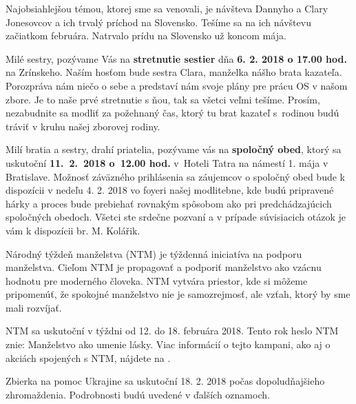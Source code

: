 Najobsiahlejšou témou, ktorej sme sa venovali, je návšteva Dannyho a Clary Jonesovcov a ich trvalý príchod na Slovensko. Tešíme sa na ich návštevu začiatkom februára. Natrvalo prídu na Slovensko už koncom mája.


Milé sestry, pozývame Vás na {\bf stretnutie sestier} dňa {\bf 6. 2. 2018 o 17.00 hod.} na Zrínskeho.
Naším hosťom bude sestra Clara, manželka nášho brata kazateľa. Porozpráva nám niečo o sebe a predstaví nám svoje plány pre prácu OS v našom zbore. Je to naše prvé stretnutie s ňou, tak sa všetci veľmi tešíme.
Prosím, nezabudnite sa modliť za požehnaný čas, ktorý tu brat kazateľ s~rodinou budú tráviť v kruhu našej zborovej rodiny.



Milí bratia a sestry, drahí priatelia,
pozývame vás na {\bf spoločný obed}, ktorý sa uskutoční {\bf 11.~2.~2018 o~12.00 hod.} v~Hoteli Tatra na námestí 1. mája v Bratislave. Možnosť záväzného prihlásenia sa záujemcov o spoločný obed bude k dispozícii v nedeľu 4. 2. 2018 vo foyeri našej modlitebne, kde budú pripravené hárky a proces bude prebiehať rovnakým spôsobom ako pri predchádzajúcich spoločných obedoch. Všetci ste srdečne pozvaní a v prípade súvisiacich otázok je vám k dispozícii br. M. Kolářik.


Národný týždeň manželstva (NTM) je týždenná iniciatíva na podporu manželstva. Cieľom NTM je propagovať a podporiť manželstvo ako vzácnu hodnotu pre moderného človeka. NTM vytvára priestor, kde si môžeme pripomenúť, že spokojné manželstvo nie je samozrejmosť, ale vzťah, ktorý by sme mali rozvíjať.

NTM sa uskutoční v týždni od 12. do 18. februára 2018. Tento rok heslo NTM znie: Manželstvo ako umenie lásky. Viac informácií o tejto kampani, ako aj o akciách spojených s NTM, nájdete na .


Zbierka na pomoc Ukrajine sa uskutoční 18. 2. 2018 počas dopoludňajšieho zhromaždenia. Podrobnosti budú uvedené v ďalších oznamoch.



